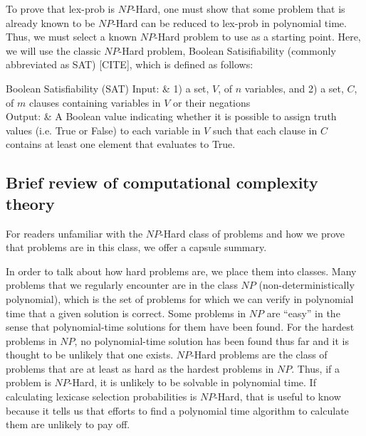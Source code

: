 \documentclass[sigconf]{acmart}
\begin{document}
To prove that {\sc lex-prob} is $NP$-Hard, one must show that some problem that is already known to be $NP$-Hard can be reduced to {\sc lex-prob} in polynomial time. Thus, we must select a known $NP$-Hard problem to use as a starting point. Here, we will use the classic $NP$-Hard problem, {\sc Boolean Satisifiability} (commonly abbreviated as {\sc SAT}) [CITE], which is defined as follows:

\begin{problem}[ruled]{Boolean Satisfiability (SAT)}
  Input: & 1) a set, $V$, of $n$ variables, and 2) a set, $C$, of $m$ clauses containing variables in $V$ or their negations\\
  Output: & A Boolean value indicating whether it is possible to assign truth values (i.e. True or False) to each variable in $V$ such that each clause in $C$ contains at least one element that evaluates to True. \\
\end{problem}


\subsection{Brief review of computational complexity theory}

For readers unfamiliar with the $NP$-Hard class of problems and how we prove that problems are in this class, we offer a capsule summary. 

In order to talk about how hard problems are, we place them into classes. Many problems that we regularly encounter are in the class $NP$ (non-deterministically polynomial), which is the set of problems for which we can verify in polynomial time that a given solution is correct. Some problems in $NP$ are ``easy'' in the sense that polynomial-time solutions for them have been found. For the hardest problems in $NP$, no polynomial-time solution has been found thus far and it is thought to be unlikely that one exists. $NP$-Hard problems are the class of problems that are at least as hard as the hardest problems in $NP$. Thus, if a problem is $NP$-Hard, it is unlikely to be solvable in polynomial time. If calculating lexicase selection probabilities is $NP$-Hard, that is useful to know because it tells us that efforts to find a polynomial time algorithm to calculate them are unlikely to pay off.
\end{document}
